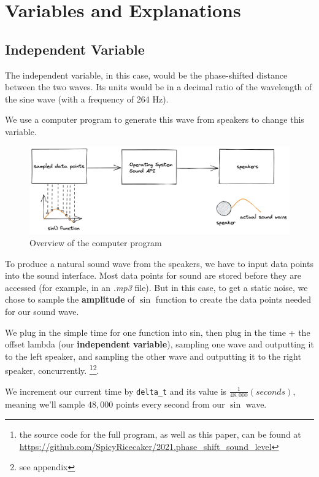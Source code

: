 \documentclass[index]{subfiles}
\begin{document}
\section{Variables and Explanations}

\subsection{Independent Variable}

The independent variable, in this case, would be the phase-shifted distance between the two waves. Its units would be in a decimal ratio of the wavelength of the sine wave (with a frequency of 264 Hz).

We use a computer program to generate this wave from speakers to change this variable.

\begin{figure}[H]
    \centering
    \includegraphics[scale=0.2]{res/layout.png}
    \caption{Overview of the computer program}
\end{figure}

To produce a natural sound wave from the speakers, we have to input data points into the sound interface. Most data points for sound are stored before they are accessed (for example, in an \textit{.mp3} file). But in this case, to get a static noise, we chose to sample the \textbf{amplitude} of \(\sin\) function to create the data points needed for our sound wave.

We plug in the simple time for one function into sin, then plug in the time + the offset lambda (our \textbf{independent variable}), sampling one wave and outputting it to the left speaker, and sampling the other wave and outputting it to the right speaker, concurrently. \footnote[1]{the source code for the full program, as well as this paper, can be found at \href{https://github.com/SpicyRicecaker/2021.phase\_shift\_sound\_level}{https://github.com/SpicyRicecaker/2021.phase\_shift\_sound\_level}}\footnote[2]{see appendix}.


We increment our current time  by \verb+delta_t+ and its value is \(\frac{1}{48,000}(seconds)\), meaning we'll sample \(48,000\) points every second from our \(\sin\) wave.
\end{document}
